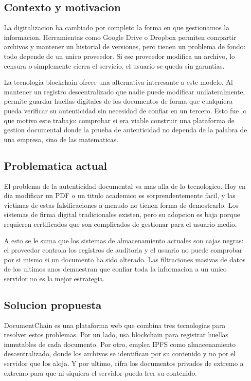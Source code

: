 \documentclass[11pt, a4paper]{article}
\begin{document}
\subsection{Contexto y motivacion}

La digitalizacion ha cambiado por completo la forma en que gestionamos la informacion. Herramientas como Google Drive o Dropbox permiten compartir archivos y mantener un historial de versiones, pero tienen un problema de fondo: todo depende de un unico proveedor. Si ese proveedor modifica un archivo, lo censura o simplemente cierra el servicio, el usuario se queda sin garantias.

La tecnologia blockchain ofrece una alternativa interesante a este modelo. Al mantener un registro descentralizado que nadie puede modificar unilateralmente, permite guardar huellas digitales de los documentos de forma que cualquiera pueda verificar su autenticidad sin necesidad de confiar en un tercero. Esto fue lo que motivo este trabajo: comprobar si era viable construir una plataforma de gestion documental donde la prueba de autenticidad no dependa de la palabra de una empresa, sino de las matematicas.

\subsection{Problematica actual}

El problema de la autenticidad documental va mas alla de lo tecnologico. Hoy en dia modificar un PDF o un titulo academico es sorprendentemente facil, y las victimas de estas falsificaciones a menudo no tienen forma de demostrarlo. Los sistemas de firma digital tradicionales existen, pero su adopcion es baja porque requieren certificados que son complicados de gestionar para el usuario medio.

A esto se le suma que los sistemas de almacenamiento actuales son cajas negras: el proveedor controla los registros de auditoria y el usuario no puede comprobar por si mismo si un documento ha sido alterado. Las filtraciones masivas de datos de los ultimos anos demuestran que confiar toda la informacion a un unico servidor no es la mejor estrategia.

\subsection{Solucion propuesta}

DocumentChain es una plataforma web que combina tres tecnologias para resolver estos problemas. Por un lado, usa blockchain para registrar huellas inmutables de cada documento. Por otro, emplea IPFS como almacenamiento descentralizado, donde los archivos se identifican por su contenido y no por el servidor que los aloja. Y por ultimo, cifra los documentos privados de extremo a extremo para que ni siquiera el servidor pueda leer su contenido.
\end{document}
